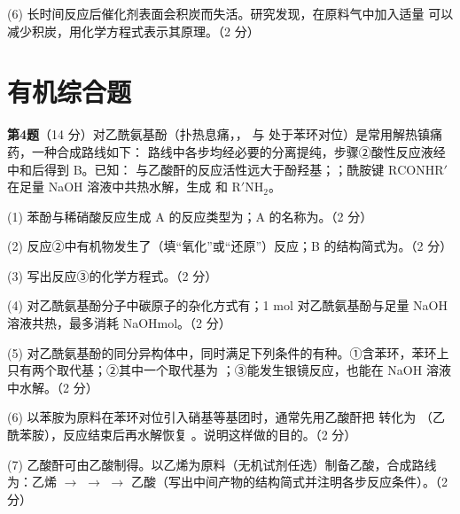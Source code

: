 (6) 长时间反应后催化剂表面会积炭而失活。研究发现，在原料气中加入适量  可以减少积炭，用化学方程式表示其原理。（2 分）

\section{有机综合题}
\noindent\textbf{第4题}（14 分）对乙酰氨基酚（扑热息痛，， 与  处于苯环对位）是常用解热镇痛药，一种合成路线如下：
路线中各步均经必要的分离提纯，步骤②酸性反应液经中和后得到 B。已知： 与乙酸酐的反应活性远大于酚羟基；；酰胺键 \(\mathrm{RCONHR'}\) 在足量 NaOH 溶液中共热水解，生成  和 \(\mathrm{R'NH_2}\)。

(1) 苯酚与稀硝酸反应生成 A 的反应类型为\tk；A 的名称为\tk。（2 分）

(2) 反应②中有机物发生了\tk（填“氧化”或“还原”）反应；B 的结构简式为\tk。（2 分）

(3) 写出反应③的化学方程式。（2 分）

(4) 对乙酰氨基酚分子中碳原子的杂化方式有\tk；1 mol 对乙酰氨基酚与足量 NaOH 溶液共热，最多消耗 NaOH\tk mol。（2 分）

(5) 对乙酰氨基酚的同分异构体中，同时满足下列条件的有\tk{}种。①含苯环，苯环上只有两个取代基；②其中一个取代基为 ；③能发生银镜反应，也能在 NaOH 溶液中水解。（2 分）

(6) 以苯胺为原料在苯环对位引入硝基等基团时，通常先用乙酸酐把  转化为 （乙酰苯胺），反应结束后再水解恢复 。说明这样做的目的。（2 分）

(7) 乙酸酐可由乙酸制得。以乙烯为原料（无机试剂任选）制备乙酸，合成路线为：乙烯 $\to$ \tk $\to$ \tk $\to$ 乙酸（写出中间产物的结构简式并注明各步反应条件）。（2 分）

